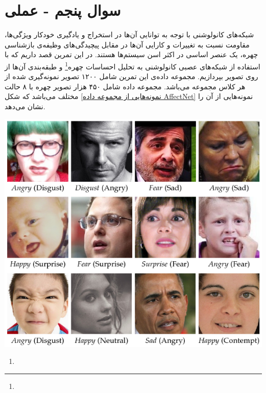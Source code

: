 \section{سوال پنجم - عملی}
شبکه‌های کانولوشنی با توجه به توانایی آن‌ها در استخراج و یادگیری خودکار ویژگی‌ها، مقاومت نسبت به تغییرات و کارایی آن‌ها در مقابل پیچیدگی‌های وظیفه‌ی بازشناسی چهره، یک عنصر اساسی در اکثر اسن سیستم‌ها هستند. در این تمرین قصد داریم که با استفاده از شبکه‌های عصبی کانولوشنی به تحلیل احساسات چهره\footnote{} و طبقه‌بندی آن‌ها از روی تصویر بپردازیم. مجموعه داده‌ی این تمرین شامل ۱۲۰۰ تصویر نمونه‌گیری شده از هر کلاس مجموعه  می‌باشد. مجموعه داده  شامل ۴۵۰ هزار تصویر چهره با ۸ حالت مختلف می‌باشد که شکل \ref{نمونه‌هایی از مجموعه داده AffectNet} نمونه‌هایی از آن را نشان می‌دهد.



\begin{center}
	\includegraphics*[width=0.6\linewidth]{pics/img2.png}
	\label{نمونه‌هایی از مجموعه داده AffectNet}
\end{center}



\begin{enumerate}
	\item 
\end{enumerate}



